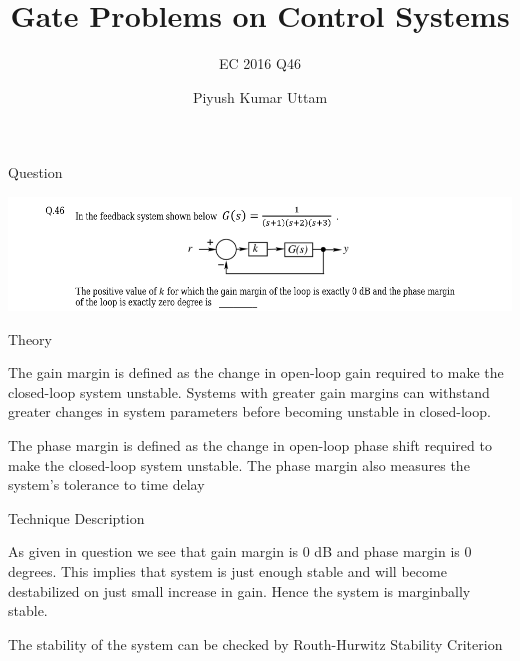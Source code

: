 \documentclass{beamer}
\title{Gate Problems on Control Systems}
\subtitle{EC 2016 Q46}
\author{Piyush Kumar Uttam}
\institute[Indian Institute of Technology,Hyderabad] %
{
  \inst{1}%
  Department of Electrical Engineering\\
  Indian Institute of Technology,Hyderabad
 }
\date{}
\begin{document}
\begin{frame}
\titlepage
\end{frame}



\begin{frame}{Question}
\begin{block}

\includegraphics[scale=0.4]{1.png}

\end{block}
\end{frame}

\begin{frame}{Theory}

\begin{block}

The gain margin is defined as the change in open-loop gain required to make the closed-loop system unstable. Systems with greater gain margins can withstand greater changes in system parameters before becoming unstable in closed-loop. 

\end{block} \vspace{16pt}
\begin{block}

The phase margin is defined as the change in open-loop phase shift required to make the closed-loop system unstable. The phase margin also measures the system's tolerance to time delay
\end{block} \vspace{16pt}




\end{frame}



\begin{frame}{Technique Description}
\begin{block}

As given in question we see that gain margin is 0 dB and phase margin is 0 degrees. This implies that system is just enough stable and will become destabilized on just small increase in gain. Hence the system is marginbally stable.
\end{block}
\end{frame}
\begin{frame}
\begin{block}


The stability of the system can be checked by Routh-Hurwitz Stability Criterion 
\end{block}

\end{frame}
\end{document}
